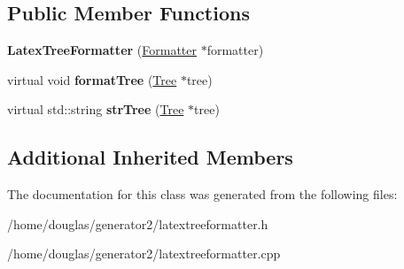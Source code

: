 \subsection*{Public Member Functions}
\begin{DoxyCompactItemize}
\item 
{\bfseries Latex\+Tree\+Formatter} (\hyperlink{classFormatter}{Formatter} $\ast$formatter)\hypertarget{classLatexTreeFormatter_aa294bd613ea6eeb42a75a52f940845a0}{}\label{classLatexTreeFormatter_aa294bd613ea6eeb42a75a52f940845a0}

\item 
virtual void {\bfseries format\+Tree} (\hyperlink{classTree}{Tree} $\ast$tree)\hypertarget{classLatexTreeFormatter_a603cfc39967f65d5f7a54f324266d7e4}{}\label{classLatexTreeFormatter_a603cfc39967f65d5f7a54f324266d7e4}

\item 
virtual std\+::string {\bfseries str\+Tree} (\hyperlink{classTree}{Tree} $\ast$tree)\hypertarget{classLatexTreeFormatter_a4109b73d13c361da7d69668f7a83560b}{}\label{classLatexTreeFormatter_a4109b73d13c361da7d69668f7a83560b}

\end{DoxyCompactItemize}
\subsection*{Additional Inherited Members}


The documentation for this class was generated from the following files\+:\begin{DoxyCompactItemize}
\item 
/home/douglas/generator2/latextreeformatter.\+h\item 
/home/douglas/generator2/latextreeformatter.\+cpp\end{DoxyCompactItemize}
